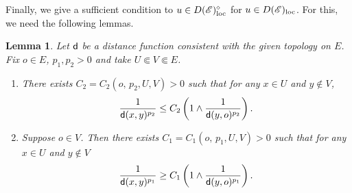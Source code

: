 \documentclass[12pt,a4paper]{article}
\newtheorem{lem}[thm]{Lemma}
\newcommand{\loc}{{\rm loc}}
\newcommand{\1}{{\bf 1}}
\begin{document}
Finally, we give a sufficient condition to 
$u\in D(\mathscr{E})^{\diamond}_{\loc}$ for $u\in D(\mathscr{E})_{\loc}$. 
For this, we need the following lemmas. 
\begin{lem}\label{lem:jumpkernelequivalence}
Let ${\sf d}$ be a distance function consistent with the given topology on 
 $E$. 
Fix $o\in E$, $p_1,p_2>0$ and take $U\Subset V\Subset E$. 
\begin{enumerate}
\item[\rm(1)] There exists $C_2=C_2(o,\, p_2,U,V)>0$ such that for any $x\in U$ and $y\notin V$,
\begin{align*}
\frac{1}{{\sf d}(x,y)^{p_2}}\leq C_2\left(1\land\frac{1}{{\sf d}(y,o)^{p_2}} \right).
\end{align*}
\item[\rm(2)] Suppose $o\in V$. Then there exists $C_1=C_1(o,\, p_1,U,V)>0$ such that for any $x\in U$ and $y\notin V$
\begin{align*}
\frac{1}{{\sf d}(x,y)^{p_1}}\geq C_1\left(1\land\frac{1}{{\sf d}(y,o)^{p_1}} \right).
\end{align*}
\end{enumerate}
\end{lem}
\end{document}
